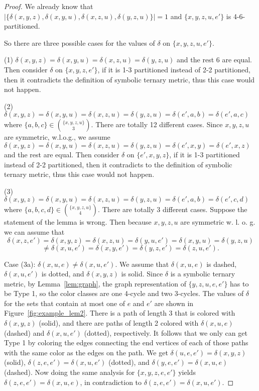 \documentclass{article}
\begin{document}
\begin{proof}

We already know that
$|\{\delta(x,y,z),\delta(x,y,u),\delta(x,z,u),\delta(y,z,u)\}|= 1$ and 
 $\{x,y,z,u,e'\}$ is 4-6-partitioned.
 
So there are three possible cases for the values of $\delta$ on  $\{x,y,z,u,e'\}$.

(1) $\delta(x,y,z)=\delta(x,y,u)=\delta(x,z,u)=\delta(y,z,u)$ and the rest 6 are equal. 
Then consider $\delta$ on $\{x,y,z,e'\}$, if it is 1-3 partitioned instead of 2-2 partitioned, 
then it contradicts the definition of symbolic ternary metric, thus this case would not happen.

(2) $\delta(x,y,z)=\delta(x,y,u)=\delta(x,z,u)=\delta(y,z,u) =\delta(e',a,b)=\delta(e',a,c)$ where
$\{a,b,c\}\in {\{x,y,z,u\} \choose 3}$. There are totally 12 different cases. Since $x,y,z,u$ are symmetric, w.l.o.g., we assume
$\delta(x,y,z)=\delta(x,y,u)=\delta(x,z,u)=\delta(y,z,u)=\delta(e',x,y)=\delta(e',x,z)$ and the rest are equal.
Then consider $\delta$ on $\{e',x,y,z\}$, if it is 1-3 partitioned instead of 2-2 partitioned, 
then it contradicts to the definition of symbolic ternary metric, thus this case would not happen.
 

(3) $\delta(x,y,z)=\delta(x,y,u)=\delta(x,z,u)=\delta(y,z,u) =\delta(e',a,b)=\delta(e',c,d)$ where
$\{a,b,c,d\}\in {\{x,y,z,u\} \choose 4}$. There are totally 3 different cases.
Suppose the statement of the lemma is wrong. Then because $x,y,z,u$ are symmetric w. l. 
o. g. we can assume that  
$$\delta(x,z,e')=\delta(x,y,z)=\delta(x,z,u)=\delta(y,u,e')=\delta(x,y,u)=\delta(y
,z,u)$$ 
 $$\neq \delta(x,u,e')=\delta(x,y,e')=\delta(y,z,e')=\delta(z,u,e').$$
 
 
 
 Case (3a): $\delta(x,u,e)\neq \delta(x,u,e')$. We assume that 
 $\delta(x,u,e)$ is dashed, $\delta(x,u,e')$ is dotted, and 
 $\delta(x,y,z)$ is solid. 
Since $\delta $ is a symbolic 
ternary metric, by Lemma~\ref{lem:graph}, the graph representation of 
 $\{y,z,u,e,e'\}$ has to be Type 1, so the color classes are 
 one 4-cycle and two 3-cycles. The values of $\delta$ 
 for the sets that contain at most one of $e$ and $e'$ are shown in 
 Figure~\ref{fig:example_lem2}. There  is a path of 
 length 3 that is colored with $\delta(x,y,z)$ (solid), and there are paths of length 2
 colored with $\delta(x,u,e)$ (dashed) and $\delta(x,u,e')$ (dotted), 
 respectively. It follows that 
 we only can get Type 1 by coloring the edges connecting the end vertices 
 of each of those paths with the same color as the edges on the path. We get 
  $\delta(u,e,e')=\delta(x,y,z)$ (solid),  $\delta(z,e,e')=\delta(x,u,e')$ (dotted), and  
  $\delta(y,e,e')=\delta(x,u,e)$ (dashed). Now doing the same analysis for $\{x,y,z,e,e'\}$ 
  yields $\delta(z,e,e')=\delta(x,u,e)$, in contradiction to $\delta(z,e,e')=\delta(x,u,e')$. 


\end{proof}
\end{document}

